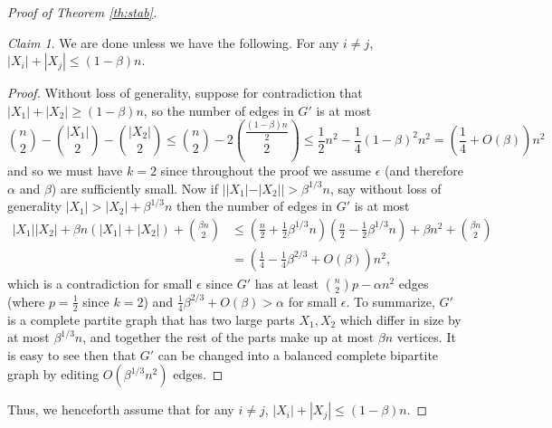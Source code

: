 \documentclass[12pt]{article}
\newcommand{\rbrac}[1]{\left( #1 \right)}
\newcommand{\eps}{\epsilon}
\renewcommand{\a}{\alpha}
\renewcommand{\b}{\beta}
\theoremstyle{definition}
\theoremstyle{remark}
\newtheorem{claim}{Claim}[theorem]
\renewcommand{\ge}{\geqslant}
\renewcommand{\le}{\leqslant}
\begin{document}
\begin{proof}[Proof of Theorem \ref{th:stab}]
\begin{claim}
We are done unless we have the following. For any $i \neq j$, $|X_i|+|X_j| \le (1-\b)n$.
\end{claim}
\begin{proof}
Without loss of generality, suppose for contradiction that  $|X_1| + |X_2| \ge (1-\b)n$, so the number of edges in $G'$ is at most 
\[
\binom{n}{2} - \binom{|X_1|}{2} - \binom{|X_2|}{2} \le \binom{n}{2}- 2\binom{\frac{(1-\b)n}{2}}{2} \le \frac12 n^2 - \frac14 (1-\b)^2 n^2= \rbrac{\frac14 +O(\b)} n^2
\]
 and so we must have $k=2$ since throughout the proof we assume $\eps$ (and therefore $\a$ and $\b$) are sufficiently small. Now if $||X_1| - |X_2|| >\b^{1/3} n$, say without loss of generality $|X_1| > |X_2| + \b^{1/3} n$ then the number of edges in $G'$ is at most 
 \begin{align*}
|X_1||X_2| + \b n (|X_1| + |X_2|) + \binom{\b n }{2} &\le \rbrac{\frac n2 +  \frac12 \b^{1/3} n}\rbrac{\frac n2 -  \frac12 \b^{1/3}  n} + \b n^2 + \binom{\b n }{2}\\
& = \rbrac{\frac14 -\frac14 \b^{2/3} + O(\b)}n^2,
\end{align*}
 which is a contradiction for small $\eps$ since $G'$ has at least $\binom{n}{2}p- \a n^2$ edges (where $p=\frac12$ since $k=2$) and $\frac 14 \b^{2/3} +O(\b) > \a$ for small $\eps$. To summarize, $G'$ is a complete partite graph that has two large parts $X_1, X_2$ which differ in size by at most $\b^{1/3} n$, and together the rest of the parts make up at most $\b n$ vertices. It is easy to see then that $G'$ can be changed into a balanced complete bipartite graph by editing $O(\b^{1/3} n^2)$ edges.  
\end{proof}
Thus, we henceforth assume that for any $i \neq j$, $|X_i|+|X_j| \le (1-\b)n$.


\end{proof}
\end{document}

